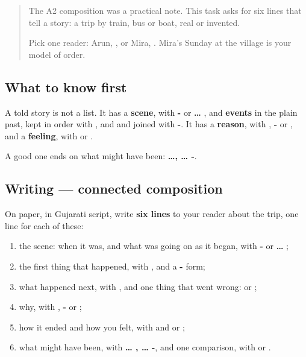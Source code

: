 \begin{quote}
The A2 composition was a practical note. This task asks for six lines that tell a story: a trip by train, bus or boat, real or invented.

Pick one reader: Arun, \textbf{}, or Mira, \textbf{}. Mira's Sunday at the village is your model of order.
\end{quote}

\subsection*{What to know first}
A told story is not a list. It has a \textbf{scene}, with \textbf{- } or \textbf{ … }, and \textbf{events} in the plain past, kept in order with \textbf{}, \textbf{ } and \textbf{} and joined with \textbf{-}. It has a \textbf{reason}, with \textbf{ }, \textbf{- } or \textbf{}, and a \textbf{feeling}, with \textbf{  } or \textbf{  }.

A good one ends on what might have been: \textbf{ …,  … -}.

\subsection*{Writing — connected composition}
On paper, in Gujarati script, write \textbf{six lines} to your reader about the trip, one line for each of these:

\begin{enumerate}
\raggedright
  \item the scene: when it was, and what was going on as it began, with \textbf{- } or \textbf{ … };
  \item the first thing that happened, with \textbf{}, and a \textbf{-} form;
  \item what happened next, with \textbf{ }, and one thing that went wrong: \textbf{ } or \textbf{ };
  \item why, with \textbf{ }, \textbf{- } or \textbf{};
  \item how it ended and how you felt, with \textbf{} and \textbf{  } or \textbf{  };
  \item what might have been, with \textbf{ … ,  … -}, and one comparison, with \textbf{} or \textbf{}.
\end{enumerate}


